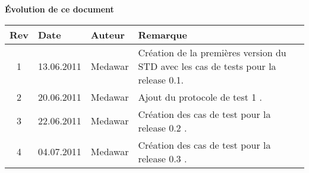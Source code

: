 \begin{large}
\textbf{Évolution de ce  document\\}
\end{large}
\begin{tabular}{|c|l|l|p{10cm}|}
\hline  Rev &  Date &  Auteur & Remarque \\ 
\hline  1 &  13.06.2011 & Medawar  & Création de la premières version du STD avec les cas de tests pour la release 0.1. \\ 
\hline  2 &  20.06.2011 & Medawar  & Ajout du protocole de test 1 . \\ 
\hline  3 &  22.06.2011 & Medawar  & Création des cas de test pour la release 0.2 . \\ 
\hline  4 &  04.07.2011 & Medawar  & Création des cas de test pour la release 0.3 . \\ 
\hline 
\end{tabular} 